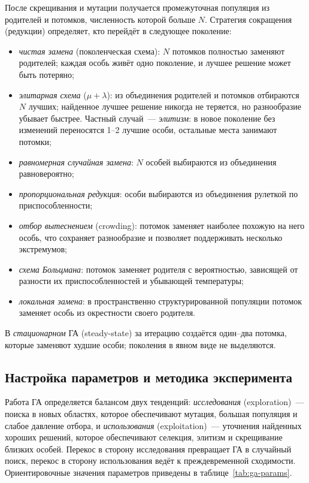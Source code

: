 После скрещивания и мутации получается промежуточная популяция из родителей и потомков, численность
которой больше $N$. Стратегия сокращения (редукции) определяет, кто перейдёт в следующее поколение:
\begin{itemize}
\item \emph{чистая замена} (поколенческая схема): $N$ потомков полностью заменяют родителей; каждая
особь живёт одно поколение, и лучшее решение может быть потеряно;
\item \emph{элитарная схема} ($\mu + \lambda$): из объединения родителей и потомков отбираются $N$
лучших; найденное лучшее решение никогда не теряется, но разнообразие убывает быстрее. Частный случай~---
\emph{элитизм}: в новое поколение без изменений переносятся 1--2 лучшие особи, остальные места
занимают потомки;
\item \emph{равномерная случайная замена}: $N$ особей выбираются из объединения равновероятно;
\item \emph{пропорциональная редукция}: особи выбираются из объединения рулеткой по приспособленности;
\item \emph{отбор вытеснением} (crowding): потомок заменяет наиболее похожую на него особь, что
сохраняет разнообразие и позволяет поддерживать несколько экстремумов;
\item \emph{схема Больцмана}: потомок заменяет родителя с вероятностью, зависящей от разности их
приспособленностей и убывающей температуры;
\item \emph{локальная замена}: в пространственно структурированной популяции потомок заменяет особь из
окрестности своего родителя.
\end{itemize}
В \emph{стационарном} ГА (steady-state) за итерацию создаётся один--два потомка, которые заменяют
худшие особи; поколения в явном виде не выделяются.

\subsection{Настройка параметров и методика эксперимента}
\label{sec:ga-method}

Работа ГА определяется балансом двух тенденций: \emph{исследования} (exploration)~--- поиска в новых
областях, которое обеспечивают мутация, большая популяция и слабое давление отбора, и
\emph{использования} (exploitation)~--- уточнения найденных хороших решений, которое обеспечивают
селекция, элитизм и скрещивание близких особей. Перекос в сторону исследования превращает ГА в
случайный поиск, перекос в сторону использования ведёт к преждевременной сходимости.
Ориентировочные значения параметров приведены в таблице~\ref{tab:ga-params}.

